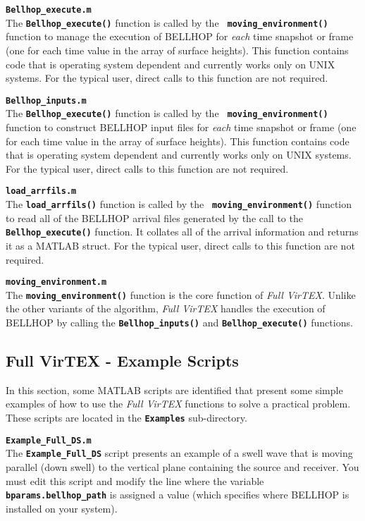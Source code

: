 \documentclass[12pt, letterpaper, oneside]{article}
\begin{document}
\begin{description}
\item {\tt \bf Bellhop\_execute.m}\hfill \\
The {\tt \bf Bellhop\_execute()} function is called by the {\tt \bf
moving\_environment()} function to manage the execution of BELLHOP for {\em
each} time snapshot or frame (one for each time value in the array of
surface heights). This function contains code that is operating system
dependent and currently works only on UNIX systems. For the typical user,
direct calls to this function are not required.

\item {\tt \bf Bellhop\_inputs.m}\hfill \\
The {\tt \bf Bellhop\_execute()} function is called by the {\tt \bf
moving\_environment()} function to construct BELLHOP input files for {\em
each} time snapshot or frame (one for each time value in the array of
surface heights).  This function contains code that is operating system
dependent and currently works only on UNIX systems. For the typical user,
direct calls to this function are not required.

\item {\tt \bf load\_arrfils.m}\hfill \\
The {\tt \bf load\_arrfils()} function is called by the {\tt \bf
moving\_environment()} function to read all of the BELLHOP arrival files
generated by the call to the {\tt \bf Bellhop\_execute()} function. It
collates all of the arrival information and returns it as a MATLAB struct.
For the typical user, direct calls to this function are not required.

\item {\tt \bf moving\_environment.m}\hfill \\
The {\tt \bf moving\_environment()} function is the core function of
{\em Full VirTEX}. Unlike the other variants of the algorithm, {\em Full VirTEX}
handles the execution of BELLHOP by calling the {\tt \bf Bellhop\_inputs()}
and {\tt \bf Bellhop\_execute()} functions.

\end{description}

\subsection{Full VirTEX - Example Scripts}
In this section, some MATLAB scripts are identified that present some
simple examples of how to use the {\em Full VirTEX} functions to solve
a practical problem. These scripts are located in the {\tt \bf Examples}
sub-directory.

\begin{description}
\item {\tt \bf Example\_Full\_DS.m}\hfill \\
The {\tt \bf Example\_Full\_DS} script presents an example of a swell
wave that is moving parallel (down swell) to the vertical plane containing
the source and receiver. You must edit this script and modify the line
where the variable {\tt \bf bparams.bellhop\_path} is assigned a value
(which specifies where BELLHOP is installed on your system).

\end{description}
\end{document}
